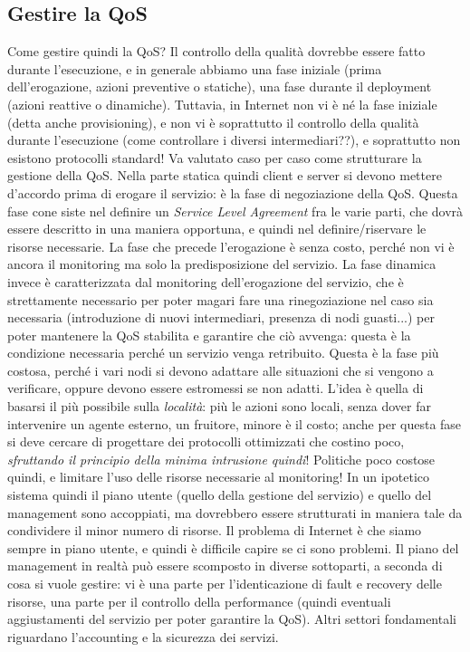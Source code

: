\subsection{Gestire la QoS}
Come gestire quindi la QoS? Il controllo della qualità dovrebbe essere fatto durante l'esecuzione, e in generale 
abbiamo una fase iniziale (prima dell'erogazione, azioni preventive o statiche), una fase durante il deployment 
(azioni reattive o dinamiche). Tuttavia, in Internet non vi è né la fase iniziale (detta anche provisioning), e non 
vi è soprattutto il controllo della qualità durante l'esecuzione (come controllare i diversi intermediari??), e
soprattutto non esistono protocolli standard! Va valutato caso per caso come strutturare la gestione della QoS.
Nella parte statica quindi client e server si devono mettere d'accordo prima di erogare il servizio: è la fase di
negoziazione della QoS. Questa fase cone siste nel definire un \textit{Service Level Agreement} fra le varie parti, 
che dovrà essere descritto in una maniera opportuna, e quindi nel definire/riservare le risorse necessarie. La fase 
che precede l'erogazione è senza costo, perché non vi è ancora il monitoring ma solo la predisposizione del servizio.
La fase dinamica invece è caratterizzata dal monitoring dell'erogazione del servizio, che è strettamente necessario 
per poter magari fare una rinegoziazione nel caso sia necessaria (introduzione di nuovi intermediari, presenza di 
nodi guasti...) per poter mantenere la QoS stabilita e garantire che ciò avvenga: questa è la condizione necessaria
perché un servizio venga retribuito. Questa è la fase più costosa, perché i vari nodi si devono adattare alle 
situazioni che si vengono a verificare, oppure devono essere estromessi se non adatti. L'idea è quella di basarsi il 
più possibile sulla \textit{località}: più le azioni sono locali, senza dover far intervenire un agente esterno, un
fruitore, minore è il costo; anche per questa fase si deve cercare di progettare dei protocolli ottimizzati che 
costino poco, \textit{sfruttando il principio della minima intrusione quindi}! Politiche poco costose quindi, e
limitare l'uso delle risorse necessarie al monitoring! In un ipotetico sistema quindi il piano utente (quello della
gestione del servizio) e quello del management sono accoppiati, ma dovrebbero essere strutturati in maniera tale da
condividere il minor numero di risorse. Il problema di Internet è che siamo sempre in piano utente, e quindi è 
difficile capire se ci sono problemi.
Il piano del management in realtà può essere scomposto in diverse sottoparti, a seconda di cosa si vuole gestire: vi 
è una parte per l'identicazione di fault e recovery delle risorse, una parte per il controllo della performance 
(quindi eventuali aggiustamenti del servizio per poter garantire la QoS). Altri settori fondamentali riguardano
l'accounting e la sicurezza dei servizi.


